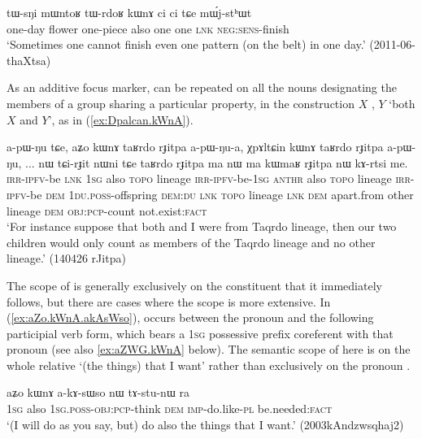 \begin{exe}
\ex \label{ex:tWrdoR.kWnA}
\gll tɯ-sŋi mɯntoʁ tɯ-rdoʁ kɯnɤ ci ci tɕe mɯ́j-stʰɯt \\
one-day flower one-piece also one one \textsc{lnk} \textsc{neg}:\textsc{sens}-finish \\
\glt `Sometimes one cannot finish even one pattern (on the belt) in one day.' (2011-06-thaXtsa)
\end{exe}

As an additive focus marker,  can be repeated on all the nouns designating the members of a group sharing a particular property, in the construction $X$ , $Y$   `both $X$ and $Y$', as in (\ref{ex:Dpalcan.kWnA}).

\largerpage
\begin{exe}
\ex \label{ex:Dpalcan.kWnA}
 \gll a-pɯ-ŋu tɕe, aʑo kɯnɤ taʁrdo rɟitpa a-pɯ-ŋu-a, χpɤltɕin kɯnɤ taʁrdo rɟitpa a-pɯ-ŋu, ... nɯ tɕi-rɟit nɯni tɕe taʁrdo rɟitpa ma nɯ ma kɯmaʁ rɟitpa nɯ kɤ-rtsi me.  \\
 \textsc{irr}-\textsc{ipfv}-be \textsc{lnk} \textsc{1sg} also  \textsc{topo} lineage  \textsc{irr}-\textsc{ipfv}-be-\textsc{1sg}   \textsc{anthr} also  \textsc{topo} lineage  \textsc{irr}-\textsc{ipfv}-be { } \textsc{dem} \textsc{1du}.\textsc{poss}-offspring \textsc{dem}:\textsc{du} \textsc{lnk}  \textsc{topo} lineage \textsc{lnk} \textsc{dem} apart.from other lineage \textsc{dem} \textsc{obj}:\textsc{pcp}-count not.exist:\textsc{fact} \\
 \glt `For instance suppose that both  and I were from Taqrdo lineage, then our two children would only count as members of the Taqrdo lineage and no other lineage.' (140426 rJitpa)
\end{exe}

The scope of   is generally exclusively on the constituent that it immediately follows, but there are cases where the scope is more extensive. In (\ref{ex:aZo.kWnA.akAsWso}),  occurs between the pronoun  and the following participial verb form, which bears a \textsc{1sg} possessive prefix  coreferent with that pronoun (see also \ref{ex:aZWG.kWnA} below). The semantic scope of  here is on the whole relative  `(the things) that I want' rather than exclusively on the pronoun .

\begin{exe}
\ex \label{ex:aZo.kWnA.akAsWso}
 \gll aʑo kɯnɤ a-kɤ-sɯso nɯ tɤ-stu-nɯ ra \\
 \textsc{1sg} also \textsc{1sg}.\textsc{poss}-\textsc{obj}:\textsc{pcp}-think \textsc{dem} \textsc{imp}-do.like-\textsc{pl} be.needed:\textsc{fact} \\
 \glt `(I will do as you say, but) do also the things that I want.' (2003kAndzwsqhaj2)
\end{exe}

